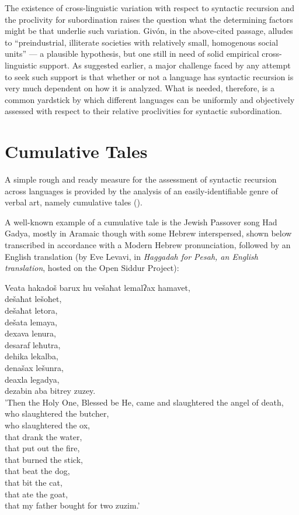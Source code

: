 \documentclass[output=paper,colorlinks,citecolor=brown
]{langscibook}
\begin{document}
The existence of cross-linguistic variation with respect to syntactic recursion and the proclivity for subordination raises the question what the determining factors might be that underlie such variation.  Givón, in the above-cited passage, alludes to ``preindustrial, illiterate societies with relatively small, homogenous social units'' — a plausible hypothesis, but one still in need of solid empirical cross-linguistic support.  As suggested earlier, a major challenge faced by any attempt to seek such support is that whether or not a language has syntactic recursion is very much dependent on how it is analyzed.  What is needed, therefore, is a common yardstick by which different languages can be uniformly and objectively assessed with respect to their relative proclivities for syntactic subordination.

\section{Cumulative Tales}
A simple rough and ready measure for the assessment of syntactic recursion across languages is provided by the analysis of an easily-identifiable genre of verbal art, namely cumulative tales (\cites[230-234]{thompson1946folktale}[522:536]{aarne1961types}).

A well-known example of a cumulative tale is the Jewish Passover song Had Gadya, mostly in Aramaic though with some Hebrew interspersed, shown below transcribed in accordance with a Modern Hebrew pronunciation, followed by an English translation (by Eve Levavi, in \emph{Haggadah for Pesah, an English translation}, hosted on the Open Siddur Project):

\ea

Veata hakadoš barux hu vešaħat lemalʔax hamavet,\\	
 dešaħat lešoħet,\\
 dešaħat letora,\\
 dešata lemaya,\\
 dexava lenura,\\
 desaraf leħutra,\\
 dehika lekalba,\\
 denašax lešunra,\\
 deaxla legadya,\\
 dezabin aba bitrey zuzey.\\

 'Then the Holy One, Blessed be He, came and slaughtered the angel of death,\\
 who slaughtered the butcher,\\
 who slaughtered the ox, \\
 that drank the water, \\
 that put out the fire, \\
 that burned the stick, \\
 that beat the dog, \\
 that bit the cat, \\
 that ate the goat, \\
 that my father bought for two zuzim.'
\end{document}
